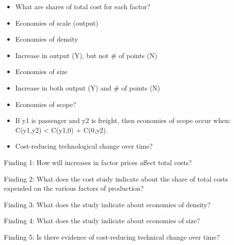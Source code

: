 \documentclass[]{article}
\providecommand{\tightlist}{%
  \setlength{\itemsep}{0pt}\setlength{\parskip}{0pt}}
\begin{document}
\begin{itemize}
\tightlist
\item
  What are shares of total cost for each factor?
\item
  Economies of scale (output)
\item
  Economies of density
\item
  Increase in output (Y), but not \# of points (N)
\item
  Economies of size
\item
  Increase in both output (Y) and \# of points (N)
\item
  Economies of scope?
\item
  If y1 is passenger and y2 is freight, then economies of scope occur
  when: C(y1,y2) \textless{} C(y1,0) + C(0,y2).
\item
  Cost-reducing technological change over time?
\end{itemize}

Finding 1: How will increases in factor prices affect total costs?

Finding 2: What does the cost study indicate about the share of total
costs expended on the various factors of production?

Finding 3: What does the study indicate about economies of density?

Finding 4: What does the study indicate about economies of size?

Finding 5: Is there evidence of cost-reducing technical change over
time?
\end{document}
